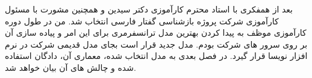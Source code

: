  بعد از همفکری با استاد محترم کارآموزی دکتر سیدین و همچنین مشورت با مسئول کارآموزی شرکت پروژه بازشناسی گفتار فارسی انتخاب شد. من در طول دوره کارآموزی موظف به پیدا کردن بهترین مدل ترانسفرمری برای این امر و پیاده سازی آن بر روی سرور های شرکت بودم. مدل جدید قرار است بجای مدل قدیمی شرکت در نرم افزار نویسا قرار گیرد. در فصل بعدی به مدل انتخاب شده، معماری آن، دادگان استفاده شده و چالش های آن بیان خواهد شد. 
